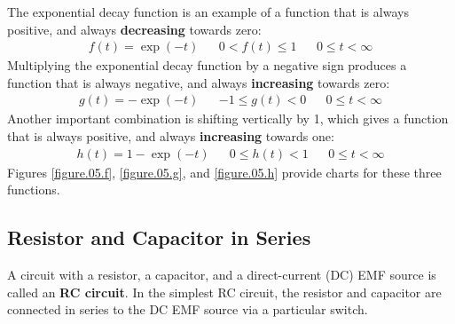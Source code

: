 The exponential decay function is an example of a function that is always positive, and always \textbf{decreasing} towards zero:
\begin{align}
    f(t) = \exp(-t) && 0 < f(t) \leq 1 && 0 \leq t < \infty
\end{align}
Multiplying the exponential decay function by a negative sign produces a function that is always negative, and always \textbf{increasing} towards zero:
\begin{align}
    g(t) = -\exp(-t) && -1 \leq g(t) < 0 && 0 \leq t < \infty
\end{align}
Another important combination is shifting vertically by 1, which gives a function that is always positive, and always \textbf{increasing} towards one:
\begin{align}
    h(t) = 1 - \exp(-t) && 0 \leq h(t) < 1 && 0 \leq t < \infty
\end{align}
Figures \ref{figure.05.f}, \ref{figure.05.g}, and \ref{figure.05.h} provide charts for these three functions.
%
\subsection{Resistor and Capacitor in Series}
%
A circuit with a resistor, a capacitor, and a direct-current (DC) EMF source is called an \textbf{RC circuit}. In the simplest RC circuit, the resistor and capacitor are connected in series to the DC EMF source via a particular switch.
%
